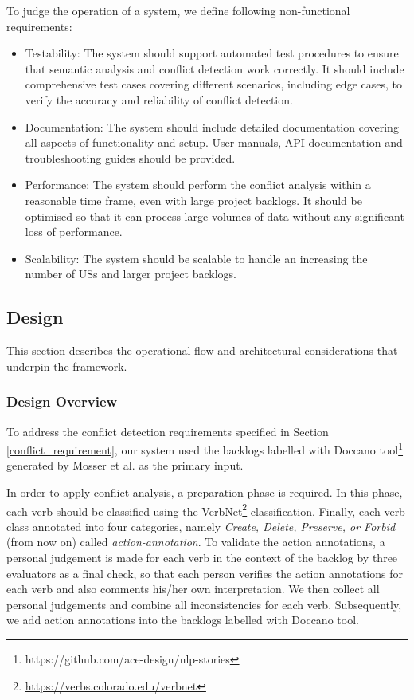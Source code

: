 To judge the operation of a system, we define following non-functional requirements:
\begin{itemize}
	\item Testability: The system should support automated test procedures to ensure that semantic analysis and conflict detection work correctly. It should include comprehensive test cases covering different scenarios, including edge cases, to verify the accuracy and reliability of conflict detection.
	
	\item Documentation: The system should include detailed documentation covering all aspects of functionality and setup. User manuals, API documentation and troubleshooting guides should be provided. 
	
	\item Performance: The system should perform the conflict analysis within a reasonable time frame, even with large project backlogs. It should be optimised so that it can process large volumes of data without any significant loss of performance.
	
	\item Scalability: The system should be scalable to handle an increasing the number of USs and larger project backlogs.
		
\end{itemize}

\subsection{Design}\label{conflict_desing}
This section describes the operational flow and architectural considerations that underpin the framework.
\subsubsection*{Design Overview}
To address the conflict detection requirements specified in Section \ref{conflict_requirement}, our system used the backlogs labelled with Doccano tool\footnote{https://github.com/ace-design/nlp-stories} generated by Mosser et al. as the primary input\cite{arulmohan2023extracting}. 

In order to apply conflict analysis, a preparation phase is required. In this phase, each verb should be classified using the VerbNet\footnote{\href{https://verbs.colorado.edu/verbnet}{https://verbs.colorado.edu/verbnet}} classification. Finally, each verb class annotated into four categories, namely \textit{Create, Delete, Preserve, or Forbid} (from now on) called \textit{action-annotation}. To validate the action annotations, a personal judgement is made for each verb in the context of the backlog by three evaluators as a final check, so that each person verifies the action annotations for each verb and also comments his/her own interpretation. We then collect all personal judgements and combine all inconsistencies for each verb. Subsequently, we add action annotations into the backlogs labelled with Doccano tool. 

